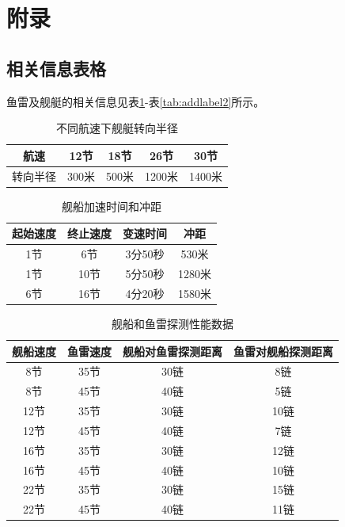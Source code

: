 \documentclass[12pt]{article}%
\begin{document}
\section{附录}
\renewcommand\thesubsection{\fontsize{12pt}{0}附录\arabic{subsection}}
\subsection{相关信息表格}
鱼雷及舰艇的相关信息见表\ref{tab:addlabel1}-表\ref{tab:addlabel2}所示。
\begin{table}[h]
  \centering{}
  \caption{\heiti{}不同航速下舰艇转向半径}
    \begin{tabular}{c|c|c|c|c}
    \hline
    航速 & 12节 & 18节 & 26节 & 30节 \bigstrut[b]\\
    \hline
    转向半径 & 300米 & 500米 & 1200米 & 1400米 \bigstrut[t]\\
    \hline
    \end{tabular}%
  \label{tab:addlabel1}%
\end{table}%

\begin{table}[h]
  \centering
  \caption{\heiti{}舰船加速时间和冲距}
    \begin{tabular}{c|c|c|c}
        \hline
    起始速度 & 终止速度 & 变速时间 & 冲距 \\
        \hline
    1节 & 6节 & 3分50秒 & 530米 \\
        \hline
    1节 & 10节 & 5分50秒 & 1280米 \\
        \hline
    6节 & 16节 & 4分20秒 & 1580米 \\
        \hline
    \end{tabular}%
  \label{tab:addlabel}%
\end{table}

\begin{table}[h]
  \centering{}
  \caption{\heiti{}舰船和鱼雷探测性能数据}
    \begin{tabular}{c|c|c|c}
        \hline
    舰船速度 & 鱼雷速度 & 舰船对鱼雷探测距离 & 鱼雷对舰船探测距离 \bigstrut[b]\\
    \hline
    8节 & 35节 & 30链 & 8链 \bigstrut\\
    \hline
    8节 & 45节 & 40链 & 5链 \bigstrut\\
    \hline
    12节 & 35节 & 30链 & 10链 \bigstrut\\
    \hline
    12节 & 45节 & 40链 & 7链 \bigstrut\\
    \hline
    16节 & 35节 & 30链 & 12链 \bigstrut\\
    \hline
    16节 & 45节 & 40链 & 10链 \bigstrut\\
    \hline
    22节 & 35节 & 30链 & 15链 \bigstrut\\
    \hline
    22节 & 45节 & 40链 & 11链 \bigstrut[t]\\
        \hline
    \end{tabular}%
  \label{tab:addlabel3}%
\end{table}
\end{document}
